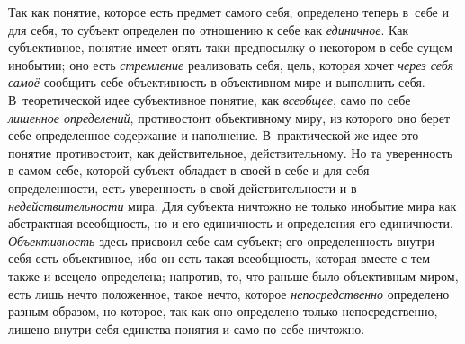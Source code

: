 Так как понятие, которое есть предмет самого себя, определено
теперь в~себе и для себя, то субъект определен по отношению к себе как
{\em единичное}. Как
субъективное, понятие имеет опять-таки предпосылку о некотором в-себе-сущем
инобытии; оно есть {\em стремление}
реализовать себя, цель, которая хочет
{\em через себя самоё}
сообщить себе объективность в объективном мире и выполнить
себя. В~теоретической идее субъективное понятие, как
{\em всеобщее}, само по
себе {\em лишенное определений},
противостоит объективному миру, из которого оно берет себе
определенное содержание и наполнение. В~практической же идее это понятие
противостоит, как действительное, действительному. Но та уверенность в
самом себе, которой субъект обладает в своей
в-себе-и-для-себя-определенности, есть уверенность в свой действительности
и в {\em недействительности}
мира. Для субъекта ничтожно не только инобытие мира как
абстрактная всеобщность, но и его единичность и определения его
единичности. {\em Объективность}
здесь присвоил себе сам субъект; его определенность внутри
себя есть объективное, ибо он есть такая всеобщность, которая вместе с тем
также и всецело определена; напротив, то, что раньше было объективным
миром, есть лишь нечто положенное, такое нечто, которое
{\em непосредственно}
определено разным образом, но которое, так как оно определено
только непосредственно, лишено внутри себя единства понятия и само по себе
ничтожно.

